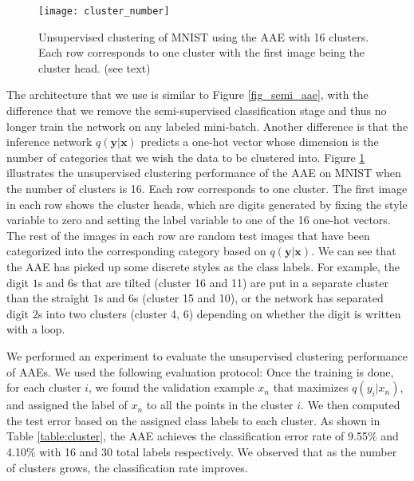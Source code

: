 \documentclass{article}
\begin{document}
\begin{figure}[b]
\begin{center}
\centering 
\texttt{[image: cluster\_number]}
\caption{\label{fig:cluster}Unsupervised clustering of MNIST using the AAE with 16 clusters. Each row corresponds to one cluster with the first image being the cluster head. (see text)}
\end{center}
\end{figure}

The architecture that we use is similar to Figure \ref{fig_semi_aae}, with the difference that we remove the semi-supervised classification stage and thus no longer train the network on any labeled mini-batch. Another difference is that the inference network $q(\mathbf{y}|\mathbf{x})$ predicts a one-hot vector whose dimension is the number of categories that we wish the data to be clustered into. Figure \ref{fig:cluster} illustrates the unsupervised clustering performance of the AAE on MNIST when the number of clusters is 16. Each row corresponds to one cluster. The first image in each row shows the cluster heads, which are digits generated by fixing the style variable to zero and setting the label variable to one of the 16 one-hot vectors. The rest of the images in each row are random test images that have been categorized into the corresponding category based on $q(\mathbf{y}|\mathbf{x})$. We can see that the AAE has picked up some discrete styles as the class labels. For example, the digit $1$s and $6$s that are tilted (cluster 16 and 11) are put in a separate cluster than the straight $1$s and $6$s (cluster 15 and 10), or the network has separated digit $2$s into two clusters (cluster 4, 6) depending on whether the digit is written with a loop. 

We performed an experiment to evaluate the unsupervised clustering performance of AAEs. We used the following evaluation protocol: Once the training is done, for each cluster $i$, we found the validation example $x_n$ that maximizes $q(y_i|x_n)$, and assigned the label of $x_n$ to all the points in the cluster $i$. We then computed the test error based on the assigned class labels to each cluster. As shown in Table \ref{table:cluster}, the AAE achieves the classification error rate of 9.55\% and 4.10\% with 16 and 30 total labels respectively. We observed that as the number of clusters grows, the classification rate improves. 
\end{document}
